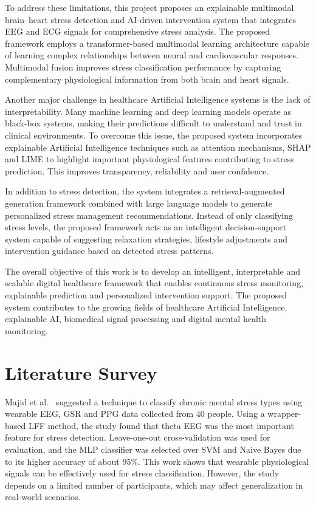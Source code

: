 \documentclass[12pt,a4paper]{report}
\begin{document}
To address these limitations, this project proposes an explainable multimodal brain–heart stress detection and AI-driven intervention system that integrates EEG and ECG signals for comprehensive stress analysis. The proposed framework employs a transformer-based multimodal learning architecture capable of learning complex relationships between neural and cardiovascular responses. Multimodal fusion improves stress classification performance by capturing complementary physiological information from both brain and heart signals.

Another major challenge in healthcare Artificial Intelligence systems is the lack of interpretability. Many machine learning and deep learning models operate as black-box systems, making their predictions difficult to understand and trust in clinical environments. To overcome this issue, the proposed system incorporates explainable Artificial Intelligence techniques such as attention mechanisms, SHAP and LIME to highlight important physiological features contributing to stress prediction. This improves transparency, reliability and user confidence.

In addition to stress detection, the system integrates a retrieval-augmented generation framework combined with large language models to generate personalized stress management recommendations. Instead of only classifying stress levels, the proposed framework acts as an intelligent decision-support system capable of suggesting relaxation strategies, lifestyle adjustments and intervention guidance based on detected stress patterns.

The overall objective of this work is to develop an intelligent, interpretable and scalable digital healthcare framework that enables continuous stress monitoring, explainable prediction and personalized intervention support. The proposed system contributes to the growing fields of healthcare Artificial Intelligence, explainable AI, biomedical signal processing and digital mental health monitoring.
\begingroup

\setlength{\parindent}{1.5em}   %
\setlength{\parskip}{6pt}        %

\chapter{Literature Survey}

\indent Majid et al.~\cite{b1} suggested a technique to classify chronic mental stress types using wearable EEG, GSR and PPG data collected from 40 people. Using a wrapper-based LFF method, the study found that theta EEG was the most important feature for stress detection. Leave-one-out cross-validation was used for evaluation, and the MLP classifier was selected over SVM and Naive Bayes due to its higher accuracy of about 95\%. This work shows that wearable physiological signals can be effectively used for stress classification. However, the study depends on a limited number of participants, which may affect generalization in real-world scenarios.
\end{document}

